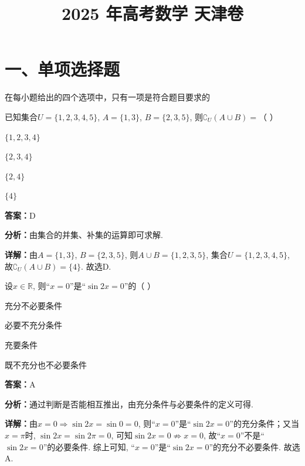 ﻿\title{2025 年高考数学 天津卷}
\date{}
\maketitle

\section*{一、单项选择题}
在每小题给出的四个选项中，只有一项是符合题目要求的

\begin{question}[points=5]
已知集合$U = \{1,2,3,4,5\}$, $A = \{1,3\}$, $B = \{2,3,5\}$, 则$\complement_U (A \cup B) = $（   ）
\begin{choices}
  \item $\{1,2,3,4\}$
  \item $\{2,3,4\}$
  \item $\{2,4\}$
  \item $\{4\}$
\end{choices}
\begin{solution}
\textbf{答案：}D

\textbf{分析：}由集合的并集、补集的运算即可求解.

\textbf{详解：}由$A = \{1,3\}$, $B = \{2,3,5\}$, 则$A \cup B = \{1,2,3,5\}$, 集合$U = \{1,2,3,4,5\}$, 故$\complement_U (A \cup B) = \{4\}$. 故选D.
\end{solution}
\end{question}

\begin{question}[points=5]
设$x \in \mathbb{R}$, 则“$x = 0$”是“$\sin 2x = 0$”的（   ）
\begin{choices}
  \item 充分不必要条件
  \item 必要不充分条件
  \item 充要条件
  \item 既不充分也不必要条件
\end{choices}
\begin{solution}
\textbf{答案：}A

\textbf{分析：}通过判断是否能相互推出，由充分条件与必要条件的定义可得.

\textbf{详解：}由$x = 0 \Rightarrow \sin 2x = \sin 0 = 0$, 则“$x = 0$”是“$\sin 2x = 0$”的充分条件；又当$x = \pi$时, $\sin 2x = \sin 2\pi = 0$, 可知$\sin 2x = 0 \not\Rightarrow x = 0$, 故“$x = 0$”不是“$\sin 2x = 0$”的必要条件. 综上可知, “$x = 0$”是“$\sin 2x = 0$”的充分不必要条件. 故选A.
\end{solution}
\end{question}

